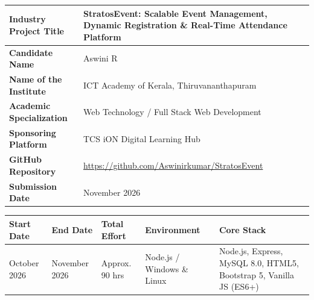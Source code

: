\documentclass[11pt,a4paper]{report}
\begin{document}
\begin{titlepage}
\begin{center}
  \noindent
  \begin{tabularx}{0.92\textwidth}{
    |>{\raggedright\arraybackslash\bfseries}p{}
    |>{\raggedright\arraybackslash}X|
  }
  \hline
  \cellcolor{LabelBlue} Industry Project Title &
  StratosEvent: Scalable Event Management, Dynamic Registration \& Real-Time Attendance Platform
  \\\hline
  \cellcolor{LabelBlue} Candidate Name &
  \cellcolor{RowGray}Aswini R
  \\\hline
  \cellcolor{LabelBlue} Name of the Institute &
  ICT Academy of Kerala, Thiruvananthapuram
  \\\hline
  \cellcolor{LabelBlue} Academic Specialization &
  Web Technology / Full Stack Web Development
  \\\hline
  \cellcolor{LabelBlue} Sponsoring Platform &
  \cellcolor{RowGray}TCS iON Digital Learning Hub
  \\\hline
  \cellcolor{LabelBlue} GitHub Repository &
  \href{https://github.com/Aswinirkumar/StratosEvent}{\color{TCSBlue}\url{https://github.com/Aswinirkumar/StratosEvent}}
  \\\hline
  \cellcolor{LabelBlue} Submission Date &
  \cellcolor{RowGray}November 2026
  \\\hline
  \end{tabularx}
  \endgroup

  \vspace{0.35in}

  \begingroup
  \fontsize{9.5}{12}\selectfont
  \renewcommand{\arraystretch}{1.45}
  \setlength{\tabcolsep}{6pt}

  \noindent
  \begin{tabularx}{0.92\textwidth}{
    |>{\raggedright\arraybackslash}p{}
    |>{\raggedright\arraybackslash}p{}
    |>{\raggedright\arraybackslash}p{}
    |>{\raggedright\arraybackslash}p{}
    |>{\raggedright\arraybackslash}X|
  }
  \hline
  \rowcolor{TCSBlue}
  \color{white}\bfseries Start Date &
  \color{white}\bfseries End Date &
  \color{white}\bfseries Total Effort &
  \color{white}\bfseries Environment &
  \color{white}\bfseries Core Stack \\\hline
  October 2026 &
  November 2026 &
  Approx. 90 hrs &
  Node.js / Windows \& Linux &
  Node.js, Express, MySQL 8.0, HTML5, Bootstrap 5, Vanilla JS (ES6+) \\\hline
  \end{tabularx}
  \endgroup

\end{center}
\end{titlepage}
\end{document}
